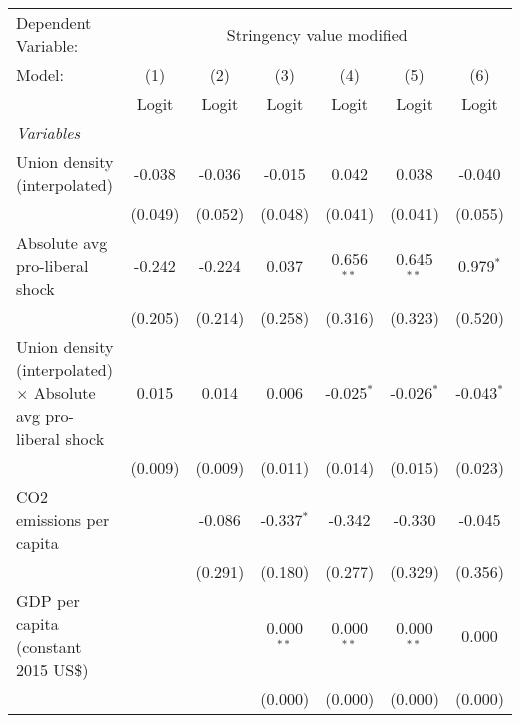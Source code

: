 
\begingroup
\centering
\begin{tabular}{lcccccc}
   \toprule
   Dependent Variable: & \multicolumn{6}{c}{Stringency value modified}\\
   Model:                                                                & (1)     & (2)     & (3)          & (4)          & (5)          & (6)\\  
                                                                         &  Logit  & Logit   & Logit        & Logit        & Logit        & Logit\\  
   \midrule
   \emph{Variables}\\
   Union density (interpolated)                                          & -0.038  & -0.036  & -0.015       & 0.042        & 0.038        & -0.040\\   
                                                                         & (0.049) & (0.052) & (0.048)      & (0.041)      & (0.041)      & (0.055)\\   
   Absolute avg pro-liberal shock                                        & -0.242  & -0.224  & 0.037        & 0.656$^{**}$ & 0.645$^{**}$ & 0.979$^{*}$\\   
                                                                         & (0.205) & (0.214) & (0.258)      & (0.316)      & (0.323)      & (0.520)\\   
   Union density (interpolated) $\times$ Absolute avg pro-liberal shock  & 0.015   & 0.014   & 0.006        & -0.025$^{*}$ & -0.026$^{*}$ & -0.043$^{*}$\\   
                                                                         & (0.009) & (0.009) & (0.011)      & (0.014)      & (0.015)      & (0.023)\\   
   CO2 emissions per capita                                              &         & -0.086  & -0.337$^{*}$ & -0.342       & -0.330       & -0.045\\   
                                                                         &         & (0.291) & (0.180)      & (0.277)      & (0.329)      & (0.356)\\   
   GDP per capita (constant 2015 US\$)                                   &         &         & 0.000$^{**}$ & 0.000$^{**}$ & 0.000$^{**}$ & 0.000\\   
                                                                         &         &         & (0.000)      & (0.000)      & (0.000)      & (0.000)\\   

\end{tabular}

